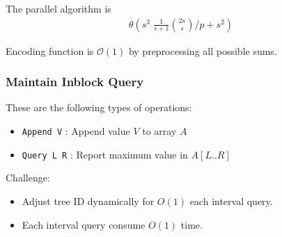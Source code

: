 \begin{frame}
	
	The parallel algorithm is 
	\begin{align*}
		\mathcal{\theta}\left(s^3 \; \frac{1}{s+1} \binom{2s}{s} \bigg/ p + s^2 \right)
	\end{align*}
\end{frame}

\begin{frame}
	
	Encoding function is $\mathcal{O}(1)$ by preprocessing all possible sums.
\end{frame}

\begin{frame}
	\frametitle{Maintain Inblock Query}
	These are the following types of operations:
	\begin{itemize}
		\item \texttt{Append V} : Append value $V$ to array $A$
		\item \texttt{Query L R} : Report maximum value in $A[L .. R]$
	\end{itemize}
	Challenge:
	\begin{itemize}
		\item Adjust tree ID dynamically for $O(1)$ each interval query.
		\item Each interval query consume $O(1)$ time.
	\end{itemize}
\end{frame}